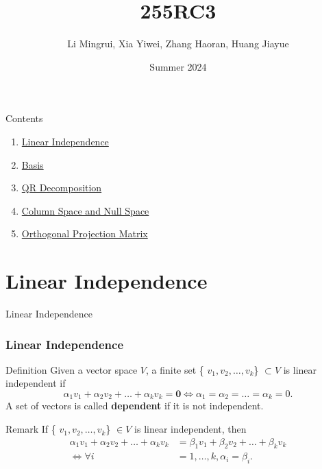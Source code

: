 \documentclass[aspectratio=169, UTF8]{ctexbeamer}
\title{\LARGE 255RC3}
\author{ Li Mingrui, Xia Yiwei, Zhang Haoran, Huang Jiayue}
\date{Summer 2024}
\begin{document}
\maketitle



\begin{frame}{Contents}
    \begin{enumerate}
        \item \hyperlink{1}{Linear Independence}
        \item \hyperlink{2}{Basis}
        \item \hyperlink{3}{QR Decomposition}
        \item \hyperlink{4}{Column Space and Null Space}
        \item \hyperlink{5}{Orthogonal Projection Matrix}
    \end{enumerate}
       
\end{frame}

    

\section{Linear Independence}
\begin{frame}[label=1]{Linear Independence}
    \frametitle{Linear Independence}
    \begin{block}{Definition}
        Given a vector space $V$, a finite set \{ $v_1,v_2,\dots,v_k$\} $\subset V$ is {linear independent} if 
        \begin{equation*}
            \alpha_1v_1+\alpha_2v_2+\dots+\alpha_kv_k=\mathbf{0}\Leftrightarrow\alpha_1=\alpha_2=\dots=\alpha_k=0.
        \end{equation*}
        A set of vectors is called \textbf{dependent} if it is not independent.
    \end{block}
    \begin{block}{Remark}
        If \{ $v_1,v_2,\dots,v_k$\} $\in V$ is {linear independent}, then
        \begin{align*}
    \alpha_1v_1+\alpha_2v_2+\dots+\alpha_kv_k&=\beta_1v_1+\beta_2v_2+\dots+\beta_kv_k\\
    \Leftrightarrow \forall i&=1,\dots,k,\alpha_i=\beta_i.
        \end{align*}
    \end{block}
\end{frame}
\end{document}
